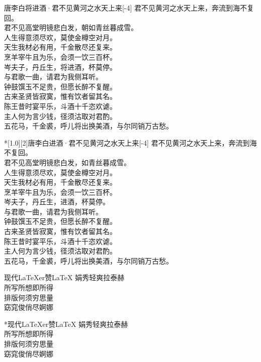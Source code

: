 \documentclass{ctexart}
\begin{document}
\centering

\begin{poem}[1.0][2]{唐}{李白}{将进酒·君不见黄河之水天上来}[-4]
君不见黄河之水天上来，奔流到海不复回。\\
君不见高堂明镜悲白发，朝如青丝暮成雪。\\
人生得意须尽欢，莫使金樽空对月。\\
天生我材必有用，千金散尽还复来。\\
烹羊宰牛且为乐，会须一饮三百杯。\\
岑夫子，丹丘生，将进酒，杯莫停。\\
与君歌一曲，请君为我侧耳听。\\
钟鼓馔玉不足贵，但愿长醉不复醒。\\
古来圣贤皆寂寞，惟有饮者留其名。\\
陈王昔时宴平乐，斗酒十千恣欢谑。\\
主人何为言少钱，径须沽取对君酌。\\
五花马，千金裘，呼儿将出换美酒，与尔同销万古愁。
\end{poem}

\begin{poem}*[1.0][2]{唐}{李白}{进酒·君不见黄河之水天上来}[-4]
君不见黄河之水天上来，奔流到海不复回。\\
君不见高堂明镜悲白发，如青丝暮成雪。\\
人生得意须尽欢，莫使金樽空对月。\\
天生我材必有用，千金散尽还复来。\\
烹羊宰牛且为乐，会须一饮三百杯。\\
岑夫子，丹丘生，进酒，杯莫停。\\
与君歌一曲，请君为我侧耳听。\\
钟鼓馔玉不足贵，但愿长醉不复醒。\\
古来圣贤皆寂寞，惟有饮者留其名。\\
陈王昔时宴平乐，斗酒十千恣欢谑。\\
主人何为言少钱，径须沽取对君酌。\\
五花马，千金裘，呼儿将出换美酒，与尔同销万古愁。
\end{poem}

  \begin{poem}{现代}{\LaTeX{}er}{赞\textbullet{}\LaTeX{}}
    娟秀轻爽拉泰赫\\
    所写所想即所得\\
    排版何须穷思量\\
    窈窕俊俏尽婀娜
  \end{poem}
  
  \begin{poem}*{现代}{\LaTeX{}er}{赞\textbullet{}\LaTeX{}}
    娟秀轻爽拉泰赫\\
    所写所想即所得\\
    排版何须穷思量\\
    窈窕俊俏尽婀娜
  \end{poem}

  
\end{document}
